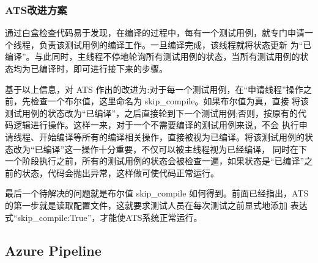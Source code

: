 \documentclass[UTF8]{ctexart}
\begin{document}
\subsubsection{ATS改进方案}
通过白盒检查代码易于发现，在编译的过程中，每有一个测试用例，就专门申请一个线程，负责该测试用例的编译工作。一旦编译完成，该线程就将状态更新
为“已编译”。与此同时，主线程不停地轮询所有测试用例的状态，当所有测试用例的状态均为已编译时，即可进行接下来的步骤。
\par
基于以上信息，对 ATS 作出的改进为:对于每一个测试用例，在“申请线程”操作之前，先检查一个布尔值，这里命名为 skip\_compile。如果布尔值为真，直接
将该测试用例的状态改为“已编译”，之后直接轮到下一个测试用例;否则，按原有的代码逻辑进行操作。这样一来，对于一个不需要编译的测试用例来说，不会
执行申请线程、开始编译等所有的编译相关操作，直接被视为已编译。将该测试用例的状态改为“已编译”这一操作十分重要，不仅可以被主线程视为已经编译，
同时在下一个阶段执行之前，所有的测试用例的状态会被检查一遍，如果状态是“已编译”之前的状态，代码会抛出异常，这样做可使代码正常运行。
\par
最后一个待解决的问题就是布尔值 skip\_compile 如何得到。前面已经指出，ATS 的第一步就是读取配置文件，这就要求测试人员在每次测试之前显式地添加
表达式“skip\_compile:True”，才能使ATS系统正常运行。

\subsection{Azure Pipeline}


\end{document}
